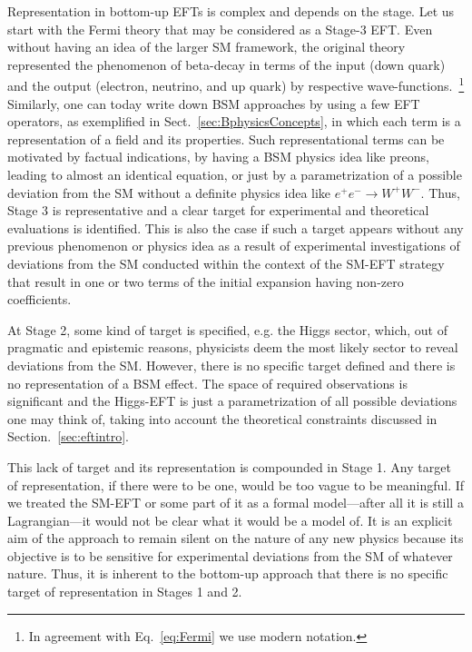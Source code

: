 Representation in bottom-up EFTs is complex and depends on the stage.
Let us start with the Fermi theory that may be considered as a Stage-3 EFT. 
Even without having an idea of the larger SM framework, the original theory represented the phenomenon of beta-decay in terms of the input (down quark) and the output (electron, neutrino, and up quark) by respective wave-functions.~\footnote{In agreement with Eq.~\ref{eq:Fermi} we use modern notation.}
Similarly, one can today write down BSM approaches by using a few EFT operators, as exemplified in Sect.~\ref{sec:BphysicsConcepts}, in which each term is a representation of a field and its properties.
Such representational terms can be motivated by factual indications, by having a BSM physics idea like preons, leading to almost an identical equation, or just by a parametrization of a possible deviation from the SM without a definite physics idea like $e^+e^-\rightarrow W^+W^-$.
Thus, Stage 3 is representative and a clear target for experimental and theoretical evaluations is identified.
This is also the case if such a target appears without any previous phenomenon or physics idea as a result of experimental investigations of deviations from the SM conducted within the context of the SM-EFT strategy that result in one or two terms of the initial expansion having non-zero coefficients.

At Stage 2, some kind of target is specified, e.g. the Higgs sector, which, 
out of pragmatic and epistemic reasons, physicists deem the most likely sector to reveal deviations from the SM.
However, there is no specific target defined and there is no representation of a BSM effect.
The space of required observations is significant and the Higgs-EFT is just a parametrization of all possible deviations one may think of, taking into account the theoretical constraints discussed in Section.~\ref{sec:eftintro}. 

This lack of target and its representation is compounded in Stage 1. Any target of representation, if there were to be one, would be too vague to be meaningful. 
If we treated the SM-EFT or some part of it as a formal model---after all it is still a Lagrangian---it would not be clear what it would be a model of.
It is an explicit aim of the approach to remain silent on the nature of any new physics because its objective is to be sensitive for experimental deviations from the SM of whatever nature. 
Thus, it is inherent to the bottom-up approach that there is no specific target of representation in Stages 1 and 2.

